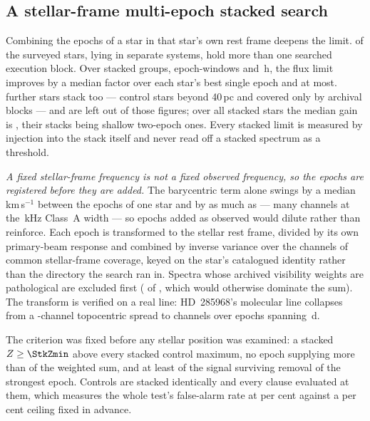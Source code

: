 \subsection{A stellar-frame multi-epoch stacked search}
\label{sec:stack}

Combining the epochs of a star in that star's own rest frame deepens the
limit. \SxStkStarCensus{} of the surveyed stars, lying in \SxStkSysCensus{}
separate systems, hold more than one searched execution block. Over
\SyStkNGroup{} stacked groups, \SyStkNEpochComb{} epoch-windows and
\SyStkHours\,h, the flux limit improves by a median factor \SyStkGainMed{}
over each star's best single epoch and \SyStkGainMax{} at most.
\SxStkStarOutside{} further stars stack too --- \SyStkStarOos{} control stars
beyond 40\,pc and \SyStkStarOther{} covered only by archival blocks --- and
are left out of those figures; over all \StkNStar{} stacked stars the median
gain is \StkLimitGainMed, their stacks being shallow two-epoch ones. Every
stacked limit is measured by injection into the stack itself and never read
off a stacked spectrum as a threshold.

\emph{A fixed stellar-frame frequency is not a fixed observed frequency, so
the epochs are registered before they are added.} The barycentric term alone
swings by a median \StkVcorrSwingMed\,km\,s$^{-1}$ between the epochs of one
star and by as much as \StkVcorrSwingMax --- many channels at the
\StkRefChanKHz\,kHz Class~A width --- so epochs added as observed would dilute
rather than reinforce. Each epoch is transformed to the stellar rest frame,
divided by its own primary-beam response and combined by inverse variance
over the channels of common stellar-frame coverage, keyed on the star's
catalogued identity rather than the directory the search ran in. Spectra
whose archived visibility weights are pathological are excluded first
(\StkBadWeight{} of \StkNProd, which would otherwise dominate the sum). The transform is verified on a real line: HD~285968's molecular
line collapses from a \StkRegTopoChan-channel topocentric spread to
\StkRegStellarChan{} channels over \StkRegNEpoch{} epochs spanning
\StkRegSpanD\,d.

The criterion was fixed before any stellar position was examined: a stacked
$Z\ge\StkZmin$ above every stacked control maximum, no epoch supplying more
than \StkDomMax{} of the weighted sum, and at least \StkJkMin{} of the signal
surviving removal of the strongest epoch. Controls are stacked identically
and every clause evaluated at them, which measures the whole test's
false-alarm rate at \StkCtrlFap{} per cent against a \StkFapCeil{} per cent
ceiling fixed in advance.

